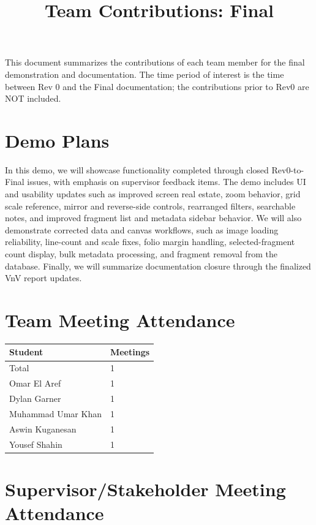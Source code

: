 \documentclass{article}
\title{Team Contributions: Final\\\progname}
\author{\authname}
\date{}
\begin{document}
\maketitle

This document summarizes the contributions of each team member for the final
demonstration and documentation.  The time period of interest is the time
between Rev 0 and the Final documentation; the contributions prior to Rev0 are
NOT included.

\section{Demo Plans}

In this demo, we will showcase functionality completed through closed Rev0-to-Final issues, with emphasis on supervisor feedback items. The demo includes UI and usability updates such as improved screen real estate, zoom behavior, grid scale reference, mirror and reverse-side controls, rearranged filters, searchable notes, and improved fragment list and metadata sidebar behavior. We will also demonstrate corrected data and canvas workflows, such as image loading reliability, line-count and scale fixes, folio margin handling, selected-fragment count display, bulk metadata processing, and fragment removal from the database. Finally, we will summarize documentation closure through the finalized VnV report updates.

\section{Team Meeting Attendance}

\begin{table}[H]
\centering
\begin{tabular}{ll}
\toprule
\textbf{Student} & \textbf{Meetings}\\
\midrule
Total & 1\\
Omar El Aref & 1\\
Dylan Garner & 1\\
Muhammad Umar Khan & 1\\
Aswin Kuganesan & 1\\
Yousef Shahin & 1\\
\bottomrule
\end{tabular}
\end{table}

\section{Supervisor/Stakeholder Meeting Attendance}
\end{document}
